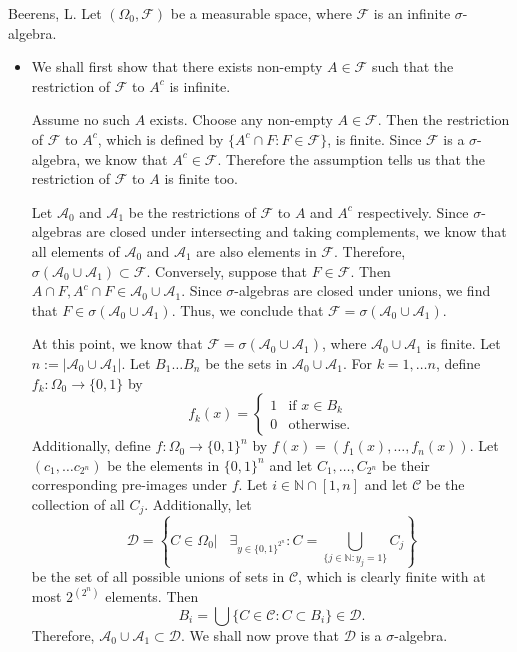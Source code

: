 \begin{solution}[2.17]{Beerens, L.}
    Let $(\Omega_0,\mathcal{F})$ be a measurable space, where $\mathcal{F}$ is an infinite $\sigma$-algebra.
    
    \begin{itemize}
        \item We shall first show that there exists non-empty $A\in\mathcal{F}$ such that the restriction of $\mathcal{F}$ to $A^c$ is infinite. 
        
        Assume no such $A$ exists. Choose any non-empty $A\in\mathcal{F}$. Then the restriction of $\mathcal{F}$ to $A^c$, which is defined by $\{A^c\cap F: F\in\mathcal{F}\}$, is finite. Since $\mathcal{F}$ is a $\sigma$-algebra, we know that $A^c\in\mathcal{F}$. Therefore the assumption tells us that the restriction of $\mathcal{F}$ to $A$ is finite too.
        
        Let $\mathcal{A}_0$ and $\mathcal{A}_1$ be the restrictions of $\mathcal{F}$ to $A$ and $A^c$ respectively. Since $\sigma$-algebras are closed under intersecting and taking complements, we know that all elements of $\mathcal{A}_0$ and $\mathcal{A}_1$ are also elements in $\mathcal{F}$. Therefore, $\sigma(\mathcal{A}_0\cup\mathcal{A}_1)\subset \mathcal{F}$. Conversely, suppose that $F\in\mathcal{F}$. Then $A\cap F,A^c\cap F\in\mathcal{A}_0\cup\mathcal{A}_1$. Since $\sigma$-algebras are closed under unions, we find that $F\in\sigma(\mathcal{A}_0\cup\mathcal{A}_1)$. Thus, we conclude that $\mathcal{F} = \sigma(\mathcal{A}_0\cup\mathcal{A}_1)$.
        
        At this point, we know that $\mathcal{F} = \sigma(\mathcal{A}_0\cup\mathcal{A}_1)$, where $\mathcal{A}_0\cup\mathcal{A}_1$ is finite. Let $n:=|\mathcal{A}_0\cup\mathcal{A}_1|$. Let $B_1\hdots B_n$ be the sets in $\mathcal{A}_0\cup\mathcal{A}_1$. For $k=1,\hdots n$, define $f_k: \Omega_0\rightarrow \{0,1\}$ by 
        $$
            f_k(x)=\begin{cases}
            1&\text{if } x\in B_k\\
            0&\text{otherwise}.
            \end{cases}
        $$
        Additionally, define $f:\Omega_0\rightarrow \{0,1\}^n$ by $f(x)=(f_1(x),\hdots,f_n(x))$. Let $(c_1,\hdots c_{2^n})$ be the elements in $\{0,1\}^n$ and let $C_1,\hdots,C_{2^n}$ be their corresponding pre-images under $f$. 
        Let $i\in\mathbb{N}\cap[1,n]$ and let $\mathcal{C}$ be the collection of all $C_j$. Additionally, let
        $$
            \mathcal{D} = \left\{C\in\Omega_0|\hspace{10pt} \exists_{y\in\{0,1\}^{2^n}}: C = \bigcup_{\{j\in\mathbb{N}:y_j=1\}}C_j \right\}
        $$
        be the set of all possible unions of sets in $\mathcal{C}$, which is clearly finite with at most $2^{(2^n)}$ elements.
        Then
        $$
            B_i = \bigcup\{C\in\mathcal{C}: C\subset B_i\}\in\mathcal{D}.
        $$
        Therefore, $\mathcal{A}_0\cup\mathcal{A}_1\subset\mathcal{D}$.
        We shall now prove that $\mathcal{D}$ is a $\sigma$-algebra. 
        

\end{itemize}
\end{solution}
